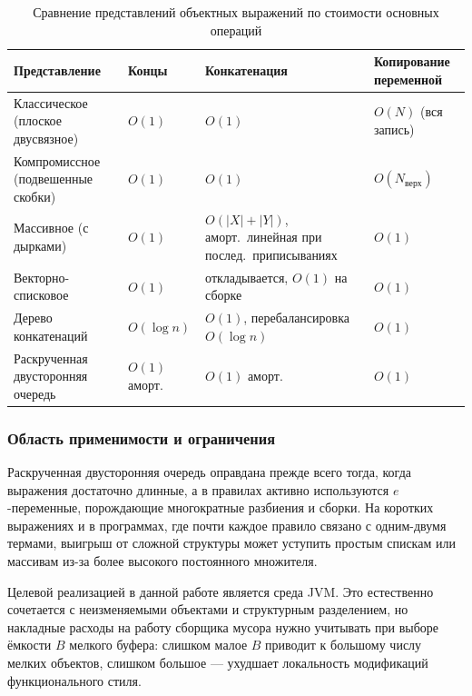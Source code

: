 \begin{table}[!htb]
\caption{\centering Сравнение представлений объектных выражений по стоимости основных операций}
\label{tab:repr-comparison}
\centering
\small
\begin{tabularx}{\linewidth}{|>{\raggedright\arraybackslash}p{3.4cm}|>{\centering\arraybackslash}p{1.9cm}|>{\raggedright\arraybackslash}X|>{\raggedright\arraybackslash}p{3.2cm}|}
\hline
\textbf{Представление} & \textbf{Концы} & \textbf{Конкатенация} & \textbf{Копирование переменной} \\
\hline
Классическое (плоское двусвязное) & \(O(1)\) & \(O(1)\) & \(O(N)\) (вся запись) \\
\hline
Компромиссное (подвешенные скобки) & \(O(1)\) & \(O(1)\) & \(O(N_{\text{верх}})\) \\
\hline
Массивное (с дырками) & \(O(1)\) & \(O(|X|+|Y|)\), аморт.~линейная при послед.~приписываниях & \(O(1)\) \\
\hline
Векторно-списковое & \(O(1)\) & откладывается, \(O(1)\) на сборке & \(O(1)\) \\
\hline
Дерево конкатенаций & \(O(\log n)\) & \(O(1)\), перебалансировка \(O(\log n)\) & \(O(1)\) \\
\hline
Раскрученная двусторонняя очередь & \(O(1)\) аморт. & \(O(1)\) аморт. & \(O(1)\) \\
\hline
\end{tabularx}
\end{table}

\subsubsection{Область применимости и ограничения}
\label{subsec:applicability}

Раскрученная двусторонняя очередь оправдана прежде всего тогда, когда
выражения достаточно длинные, а в правилах активно используются
\(e\)-переменные, порождающие многократные разбиения и сборки. На
коротких выражениях и в программах, где почти каждое правило связано с
одним-двумя термами, выигрыш от сложной структуры может уступить простым
спискам или массивам из-за более высокого постоянного множителя.

Целевой реализацией в данной работе является среда JVM. Это естественно
сочетается с неизменяемыми объектами и структурным разделением, но
накладные расходы на работу сборщика мусора нужно учитывать при выборе
ёмкости \(B\) мелкого буфера: слишком малое \(B\) приводит к большому
числу мелких объектов, слишком большое --- ухудшает локальность
модификаций функционального стиля.


